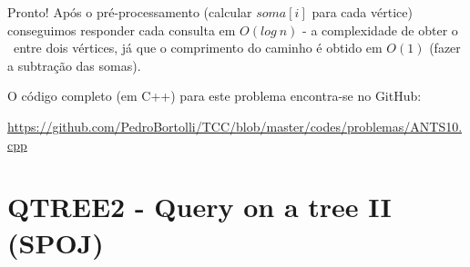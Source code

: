 Pronto! Após o pré-processamento (calcular $soma[i]$ para cada vértice) conseguimos responder cada consulta em $O(log\ n)$ - a complexidade de obter o \LCA\ entre dois vértices, já que o comprimento do caminho é obtido em $O(1)$ (fazer a subtração das somas).

\vspace{0.5cm}

O código completo (em C++) para este problema encontra-se no GitHub:

\url{https://github.com/PedroBortolli/TCC/blob/master/codes/problemas/ANTS10.cpp}

\vspace{20cm}

\section{QTREE2 - Query on a tree II  (SPOJ)}

